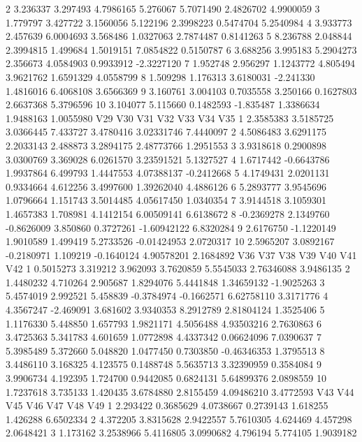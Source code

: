 \documentclass[12pt]{article}
\begin{document}
\begin{Schunk}
\begin{Soutput}
2  3.236337 3.297493 4.7986165  5.276067 5.7071490 2.4826702  4.9900059
3  1.779797 3.427722 3.1560056  5.122196 2.3998223 0.5474704  5.2540984
4  3.933773 2.457639 6.0004693  3.568486 1.0327063 2.7874487  0.8141263
5  8.236788 2.048844 2.3994815  1.499684 1.5019151 7.0854822  0.5150787
6  3.688256 3.995183 5.2904273  2.356673 4.0584903 0.9933912 -2.3227120
7  1.952748 2.956297 1.1243772  4.805494 3.9621762 1.6591329  4.0558799
8  1.509298 1.176313 3.6180031 -2.241330 1.4816016 6.4068108  3.6566369
9  3.160761 3.004103 0.7035558  3.250166 0.1627803 2.6637368  5.3796596
10 3.104077 5.115660 0.1482593 -1.835487 1.3386634 1.9488163  1.0055980
          V29        V30        V31      V32        V33         V34        V35
1   2.3585383  3.5185725  3.0366445 7.433727  3.4780416  3.02331746  7.4440097
2   4.5086483  3.6291175  2.2033143 2.488873  3.2894175  2.48773766  1.2951553
3   3.9318618  0.2900898  3.0300769 3.369028  6.0261570  3.23591521  5.1327527
4   1.6717442 -0.6643786  1.9937864 6.499793  1.4447553  4.07388137 -0.2412668
5   4.1749431  2.0201131  0.9334664 4.612256  3.4997600  1.39262040  4.4886126
6   5.2893777  3.9545696  1.0796664 1.151743  3.5014485  4.05617450  1.0340354
7   3.9144518  3.1059301  1.4657383 1.708981  4.1412154  6.00509141  6.6138672
8  -0.2369278  2.1349760 -0.8626009 3.850860  0.3727261 -1.60942122  6.8320284
9   2.6176750 -1.1220149  1.9010589 1.499419  5.2733526 -0.01424953  2.0720317
10  2.5965207  3.0892167 -0.2180971 1.109219 -0.1640124  4.90578201  2.1684892
         V36       V37      V38        V39        V40         V41        V42
1  0.5015273  3.319212 3.962093  3.7620859  5.5545033  2.76346088  3.9486135
2  1.4480232  4.710264 2.905687  1.8294076  5.4441848  1.34659132 -1.9025263
3  5.4574019  2.992521 5.458839 -0.3784974 -0.1662571  6.62758110  3.3171776
4  4.3567247 -2.469091 3.681602  3.9340353  8.2912789  2.81804124  1.3525406
5  1.1176330  5.448850 1.657793  1.9821171  4.5056488  4.93503216  2.7630863
6  3.4725363  5.341783 4.601659  1.0772898  4.4337342  0.06624096  7.0390637
7  5.3985489  5.372660 5.048820  1.0477450  0.7303850 -0.46346353  1.3795513
8  3.4486110  3.168325 4.123575  0.1488748  5.5635713  3.32390959  0.3584084
9  3.9906734  4.192395 1.724700  0.9442085  0.6824131  5.64899376  2.0898559
10 1.7237618  3.735133 1.420435  3.6784880  2.8155459  4.09486210  3.4772593
        V43       V44       V45        V46      V47      V48        V49
1  2.293422 0.3685629 4.0738667  0.2739143 1.618255 1.426288  6.6502334
2  4.372205 3.8315628 2.9422557  5.7610305 4.624469 4.457298  2.0648421
3  1.173162 3.2538966 5.4116805  3.0990682 4.796194 5.774105  1.9039182

\end{Soutput}
\end{Schunk}
\end{document}

